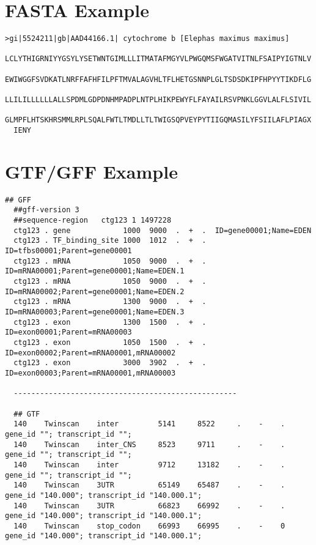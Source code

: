 \section{FASTA Example}\label{annex:fasta}
\begin{lstlisting}[numbers=none, breaklines=true]
  >gi|5524211|gb|AAD44166.1| cytochrome b [Elephas maximus maximus]
  LCLYTHIGRNIYYGSYLYSETWNTGIMLLLITMATAFMGYVLPWGQMSFWGATVITNLFSAIPYIGTNLV
  EWIWGGFSVDKATLNRFFAFHFILPFTMVALAGVHLTFLHETGSNNPLGLTSDSDKIPFHPYYTIKDFLG
  LLILILLLLLLALLSPDMLGDPDNHMPADPLNTPLHIKPEWYFLFAYAILRSVPNKLGGVLALFLSIVIL
  GLMPFLHTSKHRSMMLRPLSQALFWTLTMDLLTLTWIGSQPVEYPYTIIGQMASILYFSIILAFLPIAGX
  IENY
\end{lstlisting}

\section{GTF/GFF Example}\label{annex:gff}
\begin{lstlisting}[numbers=none, breaklines=true]
  ## GFF
  ##gff-version 3
  ##sequence-region   ctg123 1 1497228
  ctg123 . gene            1000  9000  .  +  .  ID=gene00001;Name=EDEN
  ctg123 . TF_binding_site 1000  1012  .  +  .  ID=tfbs00001;Parent=gene00001
  ctg123 . mRNA            1050  9000  .  +  .  ID=mRNA00001;Parent=gene00001;Name=EDEN.1
  ctg123 . mRNA            1050  9000  .  +  .  ID=mRNA00002;Parent=gene00001;Name=EDEN.2
  ctg123 . mRNA            1300  9000  .  +  .  ID=mRNA00003;Parent=gene00001;Name=EDEN.3
  ctg123 . exon            1300  1500  .  +  .  ID=exon00001;Parent=mRNA00003
  ctg123 . exon            1050  1500  .  +  .  ID=exon00002;Parent=mRNA00001,mRNA00002
  ctg123 . exon            3000  3902  .  +  .  ID=exon00003;Parent=mRNA00001,mRNA00003

  ---------------------------------------------------

  ## GTF
  140    Twinscan    inter         5141     8522     .    -    .    gene_id ""; transcript_id "";
  140    Twinscan    inter_CNS     8523     9711     .    -    .    gene_id ""; transcript_id "";
  140    Twinscan    inter         9712     13182    .    -    .    gene_id ""; transcript_id "";
  140    Twinscan    3UTR          65149    65487    .    -    .    gene_id "140.000"; transcript_id "140.000.1";
  140    Twinscan    3UTR          66823    66992    .    -    .    gene_id "140.000"; transcript_id "140.000.1";
  140    Twinscan    stop_codon    66993    66995    .    -    0    gene_id "140.000"; transcript_id "140.000.1";
\end{lstlisting}
